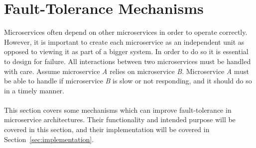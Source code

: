 \section{Fault-Tolerance Mechanisms}\label{sec:mechanisms}
Microservices often depend on other microservices in order to
operate correctly. However, it is important to create each
microservice as an independent unit as opposed to viewing it as part
of a bigger system. In order to do so it is essential to design for
failure. All interactions between two microservices must be handled
with care. Assume microservice \emph{A} relies on microservice
\emph{B}. Microservice \emph{A} must be able to handle if microservice
\emph{B} is slow or not responding, and it should do so in a timely
manner.
\\\\
This section covers some mechanisms which can improve fault-tolerance in
microservice architectures. Their functionality and intended purpose will
be covered in this section, and their implementation will be covered in 
Section~\ref{sec:implementation}.

